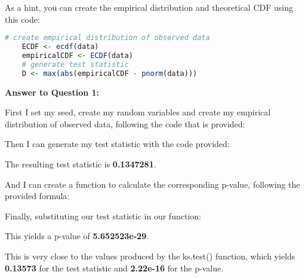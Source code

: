 \documentclass[12pt,letterpaper]{article}
\begin{document}
	
\noindent As a hint, you can create the empirical distribution and theoretical CDF using this code:

\begin{lstlisting}[language=R]
	# create empirical distribution of observed data
	ECDF <- ecdf(data)
	empiricalCDF <- ECDF(data)
	# generate test statistic
	D <- max(abs(empiricalCDF - pnorm(data))) \end{lstlisting}

\vspace{.2in}

\noindent \textbf{Answer to Question 1:}

\vspace{.1in}

\noindent First I set my seed, create my random variables and create my empirical distribution of observed data, following the code that is provided: 

\vspace{.1in}
 
\vspace{.1in}
 
\noindent Then I can generate my test statistic with the code provided: 

\vspace{.1in}
 
 \vspace{.1in}
 
\noindent The resulting test statistic is \textbf{0.1347281}. 

\noindent And I can create a function to calculate the corresponding p-value, following the provided formula: 

\vspace{.1in}
 
\vspace{.1in}

\noindent Finally, substituting our test statistic in our function: 

\vspace{.1in}
 
 \vspace{.1in}
 
\noindent  This yields a p-value of \textbf{5.652523e-29}. 

\noindent This is very close to the values produced by the ks.test() function, which yields \textbf{0.13573} for the test statistic and \textbf{2.22e-16} for the p-value. 
\end{document}
